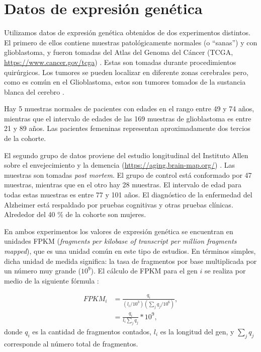\section{Datos de expresión genética}
Utilizamos datos de expresión genética obtenidos de dos experimentos distintos. El primero de ellos contiene muestras patológicamente normales (o ``sanas'') y con glioblastoma, y fueron tomadas del Atlas del Genoma del Cáncer (TCGA, \href{https://www.cancer.gov/tcga}{https://www.cancer.gov/tcga}) \cite{Brennan_2013, Tomczak2015}. Estas son tomadas durante procedimientos quirúrgicos. Los tumores se pueden localizar en diferente zonas cerebrales pero, como es común en el Glioblastoma, estos son tumores tomados de la sustancia blanca del cerebro \cite{ellingson2013probabilistic}.

Hay 5 muestras normales de pacientes con edades en el rango entre 49 y 74 años, mientras que el intervalo de edades de las 169 muestras de glioblastoma es entre 21 y 89 años. Las pacientes femeninas representan aproximadamente dos tercios de la cohorte.

El segundo grupo de datos proviene del estudio longitudinal del Instituto Allen sobre el envejecimiento y la demencia (\href{https://aging.brain-map.org/}{https://aging.brain-map.org/}) \cite{Miller_2017}. Las muestras son tomadas \textit{post mortem}. El grupo de control está conformado por 47 muestras, mientras que en el otro hay 28 muestras. El intervalo de edad para todas estas muestras es entre 77 y 101 años. El diagnóstico de la enfermedad del Alzheimer está respaldado por pruebas cognitivas y otras pruebas clínicas. Alrededor del 40 \% de la cohorte son mujeres.

En ambos experimentos los valores de expresión genética se encuentran en unidades FPKM (\textit{fragments per kilobase of transcript per million fragments mapped}), que es una unidad común en este tipo de estudios. En términos simples, dicha unidad de medida significa: la tasa de fragmentos por base multiplicada por un número muy grande ($ 10^9 $). El cálculo de FPKM para el gen $ i $ se realiza por medio de la siguiente fórmula \cite{Zhao_2021}:

\begin{equation}
	\begin{split}
		FPKM_i &= \frac{q_i}{(l_i/10^3) (\sum_{j}q_j/10^6)} ,\\
		&= \frac{q_i}{l_i \sum_j q_j} * 10^9,
	\end{split}
\end{equation}
donde $ q_i $ es la cantidad de fragmentos contados, $ l_i $ es la longitud del gen, y $ \sum_j q_j $ corresponde al número total de fragmentos.

